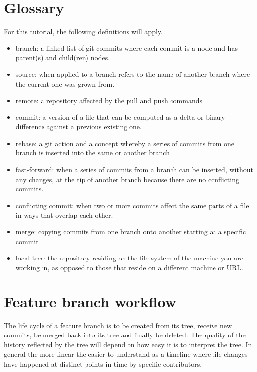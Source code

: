 \documentclass[10pt]{article}
\begin{document}
\section{Glossary}

For this tutorial, the following definitions will apply.

\begin{itemize}
    \item branch: a linked list of git commits where each commit is a node and has parent(s) and child(ren) nodes.
    \item source: when applied to a branch refers to the name of another branch where the current one was grown from.
    \item remote: a repository affected by the pull and push commands 
    \item commit: a version of a file that can be computed as a delta or binary difference against a previous existing one.
    \item rebase: a git action and a concept whereby a series of commits from one branch is inserted into the same or another branch
    \item fast-forward: when a series of commits from a branch can be inserted, without any changes, at the tip of another branch because there are no conflicting commits.
    \item conflicting commit: when two or more commits affect the same parts of a file in ways that overlap each other.  
    \item merge: copying commits from one branch onto another starting at a specific commit
    \item local tree: the repository residing on the file system of the machine you are working in, as opposed to those that reside on a different machine or URL.
\end{itemize}

\section{Feature branch workflow}

The life cycle of a feature branch is to be created from its tree, receive new commits, be merged back into its tree and finally be deleted.
The quality of the history reflected by the tree will depend on how easy it is to interpret the tree.
In general the more linear the easier to understand as a timeline where file changes have happened at distinct points in time by specific contributors.
\end{document}
